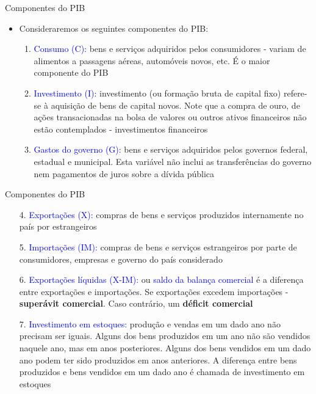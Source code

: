 \documentclass[10pt]{beamer}
\begin{document}
\begin{frame}{Componentes do PIB}
    \begin{itemize}
        \item Consideraremos os seguintes componentes do PIB:\bigskip
        \begin{enumerate}
            \item \textcolor{blue}{Consumo (C):} bens e serviços adquiridos pelos consumidores - variam de alimentos a passagens aéreas, automóveis novos, etc. É o maior componente do PIB\medskip
            \item \textcolor{blue}{Investimento (I):} investimento (ou formação bruta de capital fixo) refere-se à aquisição de bens de capital novos. Note que a compra de ouro, de ações transacionadas na bolsa de valores ou outros ativos financeiros não estão contemplados - investimentos financeiros\medskip
            \item \textcolor{blue}{Gastos do governo (G):} bens e serviços adquiridos pelos governos federal, estadual e municipal. Esta variável não inclui as transferências do governo nem pagamentos de juros sobre a dívida pública
        \end{enumerate}
    \end{itemize}
\end{frame}

\begin{frame}{Componentes do PIB}
\begin{enumerate}
    
    \item[4.] \textcolor{blue}{Exportações (X):} compras de bens e serviços produzidos internamente no país por estrangeiros\medskip
    \item[5.] \textcolor{blue}{Importações (IM):} compras de bens e serviços estrangeiros por parte de consumidores, empresas e governo do país considerado\medskip
    \item[6.] \textcolor{blue}{Exportações líquidas (X-IM):} ou \textcolor{blue}{saldo da balança comercial} é a diferença entre exportações e importações. Se exportações excedem importações - \textbf{superávit comercial}. Caso contrário, um \textbf{déficit comercial}\medskip
    \item[7.] \textcolor{blue}{Investimento em estoques:} produção e vendas em um dado ano não precisam ser iguais. Alguns dos bens produzidos em um ano não são vendidos naquele ano, mas em anos posteriores. Alguns dos bens vendidos em um dado ano podem ter sido produzidos em anos anteriores. A diferença entre bens produzidos e bens vendidos em um dado ano é chamada de investimento em estoques
\end{enumerate}
\end{frame}
\end{document}
